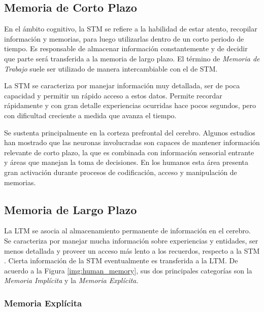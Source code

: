 
\subsection{Memoria de Corto Plazo}

En el ámbito cognitivo, la STM se refiere a la habilidad de estar atento, recopilar información  y memorias, para luego utilizarlas dentro de un corto periodo de tiempo. Es responsable de almacenar información constantemente y de decidir que parte será transferida a la memoria de largo plazo. El término de \textit{Memoria de Trabajo} suele ser utilizado de manera intercambiable con el de STM.

La STM se caracteriza por manejar información muy detallada, ser de poca capacidad y permitir un rápido acceso a estos datos. Permite recordar rápidamente y con gran detalle experiencias ocurridas hace pocos segundos, pero con dificultad creciente a medida que avanza el tiempo.

Se sustenta principalmente en la corteza prefrontal del cerebro. Algunos estudios han mostrado que las neuronas involucradas son capaces de mantener información relevante de corto plazo, la que es combinada con información sensorial entrante y áreas que manejan la toma de decisiones. %
En los humanos esta área presenta gran activación durante procesos de codificación, acceso y manipulación de memorias. %


\subsection{Memoria de Largo Plazo}

La LTM se asocia al almacenamiento permanente de información en el cerebro. Se caracteriza por manejar mucha información sobre experiencias y entidades, ser menos detallada y proveer un acceso más lento a los recuerdos, respecto a la STM \cite{Eichenbaum:2008}. Cierta información de la STM eventualmente es transferida a la LTM. De acuerdo a la Figura \ref{img:human_memory}, sus dos principales categorías son la \textit{Memoria Implícita} y la \textit{Memoria Explícita}.

\subsubsection{Memoria Explícita}

